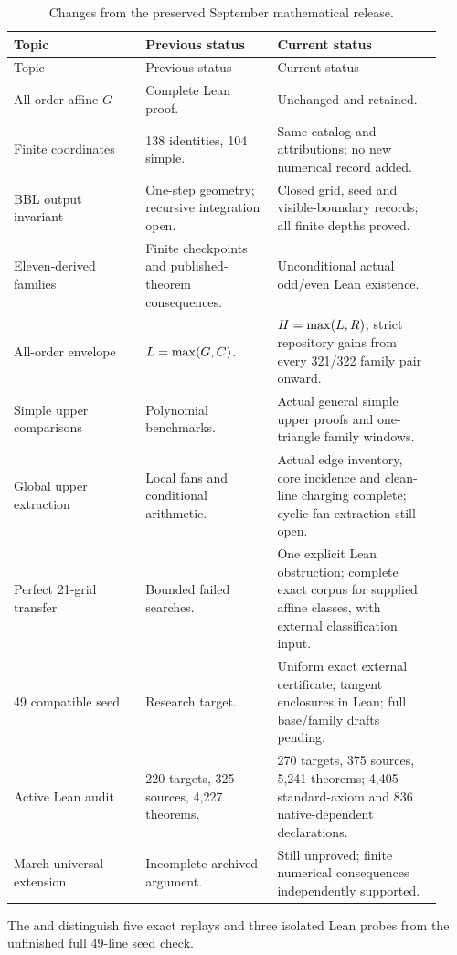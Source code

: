 \begin{longtable}{@{}P{0.29\linewidth}P{0.29\linewidth}P{0.35\linewidth}@{}}
\caption{Changes from the preserved September mathematical release.}
\label{app:release-table}\\
\toprule Topic & Previous status & Current status\\\midrule\endfirsthead
\toprule Topic & Previous status & Current status\\\midrule\endhead
\bottomrule\endfoot
All-order affine $G$ & Complete Lean proof. & Unchanged and retained.\\
Finite coordinates & 138 identities, 104 simple. & Same catalog and
attributions; no new numerical record added.\\
BBL output invariant & One-step geometry; recursive integration open. &
Closed grid, seed and visible-boundary records; all finite depths proved.\\
Eleven-derived families & Finite checkpoints and published-theorem
consequences. & Unconditional actual odd/even Lean existence.\\
All-order envelope & $L=\max(G,C)$. & $H=\max(L,R)$;
strict repository gains from every 321/322 family pair onward.\\
Simple upper comparisons & Polynomial benchmarks. & Actual general
simple upper proofs and one-triangle family windows.\\
Global upper extraction & Local fans and conditional arithmetic. &
Actual edge inventory, core incidence and clean-line charging complete;
cyclic fan extraction still open.\\
Perfect 21-grid transfer & Bounded failed searches. & One explicit
Lean obstruction; complete exact corpus for supplied affine classes,
with external classification input.\\
49 compatible seed & Research target. & Uniform exact external
certificate; tangent enclosures in Lean; full base/family drafts pending.\\
Active Lean audit & 220 targets, 325 sources, 4,227 theorems. &
270 targets, 375 sources, 5,241 theorems; 4,405 standard-axiom and
836 native-dependent declarations.\\
March universal extension & Incomplete archived argument. & Still
unproved; finite numerical consequences independently supported.\\
\end{longtable}

The 
and 
distinguish five exact replays and three isolated Lean probes from the
unfinished full 49-line seed check.
